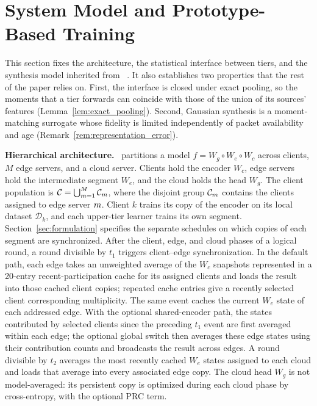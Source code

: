 \section{System Model and Prototype-Based Training}
\label{sec:preliminary}

This section fixes the architecture, the statistical interface between tiers, and the synthesis model inherited from \hsfp{}~\cite{tran2026h}. It also establishes two properties that the rest of the paper relies on. First, the interface is closed under exact pooling, so the moments that a tier forwards can coincide with those of the union of its sources' features (Lemma~\ref{lem:exact_pooling}). Second, Gaussian synthesis is a moment-matching surrogate whose fidelity is limited independently of packet availability and age (Remark~\ref{rem:representation_error}).

\noindent\textbf{Hierarchical architecture.}~
\ehsfp{} partitions a model $f=W_g\circ W_e\circ W_c$ across clients, $M$ edge servers, and a cloud server. Clients hold the encoder $W_c$, edge servers hold the intermediate segment $W_e$, and the cloud holds the head $W_g$. The client population is $\mathcal{C}=\bigcup_{m=1}^{M}\mathcal{C}_{m}$, where the disjoint group $\mathcal{C}_{m}$ contains the clients assigned to edge server $m$. Client $k$ trains its copy of the encoder on its local dataset $\mathcal D_k$, and each upper-tier learner trains its own segment. Section~\ref{sec:formulation} specifies the separate schedules on which copies of each segment are synchronized. After the client, edge, and cloud phases of a logical round, a round divisible by $t_1$ triggers client--edge synchronization. In the default path, each edge takes an unweighted average of the $W_c$ snapshots represented in a 20-entry recent-participation cache for its assigned clients and loads the result into those cached client copies; repeated cache entries give a recently selected client corresponding multiplicity. The same event caches the current $W_e$ state of each addressed edge. With the optional shared-encoder path, the states contributed by selected clients since the preceding $t_1$ event are first averaged within each edge; the optional global switch then averages these edge states using their contribution counts and broadcasts the result across edges. A round divisible by $t_2$ averages the most recently cached $W_e$ states assigned to each cloud and loads that average into every associated edge copy. The cloud head $W_g$ is not model-averaged: its persistent copy is optimized during each cloud phase by cross-entropy, with the optional PRC term.

